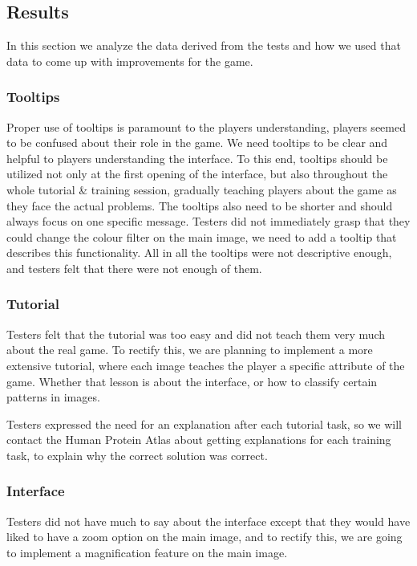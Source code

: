\subsection{Results}

In this section we analyze the data derived from the tests and how we used that data to come up with improvements for the game.

\subsubsection{Tooltips}
Proper use of tooltips is paramount to the players understanding, players seemed to be confused about their role in the game. We need tooltips to be clear and helpful to players understanding the interface. To this end, tooltips should be utilized not only at the first opening of the interface, but also throughout the whole tutorial \& training session, gradually teaching players about the game as they face the actual problems. The tooltips also need to be shorter and should always focus on one specific message. Testers did not immediately grasp that they could change the colour filter on the main image, we need to add a tooltip that describes this functionality. All in all the tooltips were not descriptive enough, and testers felt that there were not enough of them.

\subsubsection{Tutorial}
Testers felt that the tutorial was too easy and did not teach them very much about the real game. To rectify this, we are planning to implement a more extensive tutorial, where each image teaches the player a specific attribute of the game. Whether that lesson is about the interface, or how to classify certain patterns in images. 

Testers expressed the need for an explanation after each tutorial task, so we will contact the Human Protein Atlas about getting explanations for each training task, to explain why the correct solution was correct.

\subsubsection{Interface}
Testers did not have much to say about the interface except that they would have liked to have a zoom option on the main image, and to rectify this, we are going to implement a magnification feature on the main image.

